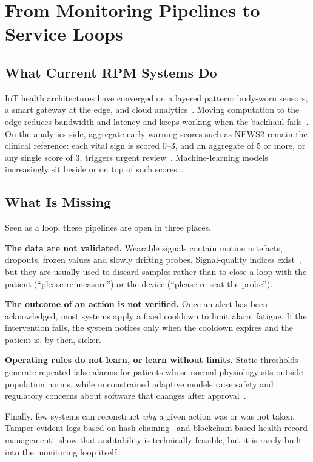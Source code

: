 \documentclass[journal]{IEEEtran}
\begin{document}
\section*{From Monitoring Pipelines to Service Loops}

\subsection*{What Current RPM Systems Do}

IoT health architectures have converged on a layered pattern: body-worn sensors, a smart gateway at the
edge, and cloud analytics~\cite{hassanalieragh2015,rahmani2018}. Moving computation to the edge reduces bandwidth and
latency and keeps working when the backhaul fails~\cite{shi2016}. On the analytics side, aggregate early-warning
scores such as NEWS2 remain the clinical reference: each vital sign is scored 0--3, and an aggregate of 5 or more, or
any single score of 3, triggers urgent review~\cite{rcp2017,smith2013}. Machine-learning models increasingly sit
beside or on top of such scores~\cite{rajkomar2019}.

\subsection*{What Is Missing}

Seen as a loop, these pipelines are open in three places.

\textbf{The data are not validated.} Wearable signals contain motion artefacts, dropouts, frozen values and slowly
drifting probes. Signal-quality indices exist~\cite{orphanidou2015}, but they are usually used to discard samples rather
than to close a loop with the patient (``please re-measure'') or the device (``please re-seat the probe'').

\textbf{The outcome of an action is not verified.} Once an alert has been acknowledged, most systems apply a fixed
cooldown to limit alarm fatigue. If the intervention fails, the system notices only when the cooldown expires and the
patient is, by then, sicker.

\textbf{Operating rules do not learn, or learn without limits.} Static thresholds generate repeated false alarms for
patients whose normal physiology sits outside population norms, while unconstrained adaptive models raise safety and
regulatory concerns about software that changes after approval~\cite{fda2021}.

Finally, few systems can reconstruct \emph{why} a given action was or was not taken. Tamper-evident logs based on
hash chaining~\cite{haber1991} and blockchain-based health-record management~\cite{azaria2016} show that auditability is
technically feasible, but it is rarely built into the monitoring loop itself.
\end{document}
